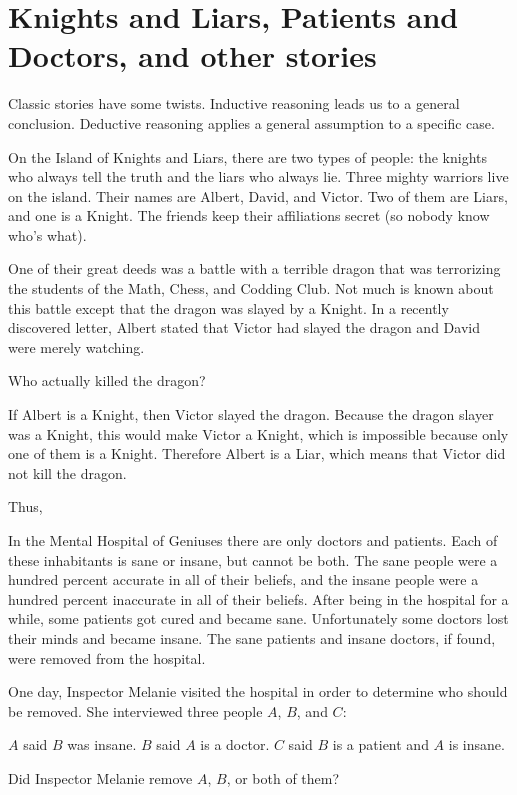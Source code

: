 \documentclass{article}
\begin{document}
\section*{Knights and Liars, Patients and Doctors, and other stories}

Classic stories have some twists. Inductive reasoning leads us to a general conclusion.
Deductive reasoning applies a general assumption to a specific case.

\begin{example*}
    \label{example:pi-2022-4-p9}
    On the Island of Knights and Liars, there are two types of people:
    the knights who always tell the truth and the liars who always lie.
    Three mighty warriors live on the island.
    Their names are Albert, David, and Victor.
    Two of them are Liars, and one is a Knight.
    The friends keep their affiliations secret (so nobody know who's what).

    One of their great deeds was a battle with a terrible dragon
    that was terrorizing the students of the Math, Chess, and Codding Club.
    Not much is known about this battle except that the dragon was slayed by a Knight.
    In a recently discovered letter, Albert stated that Victor had slayed the dragon
    and David were merely watching.

    Who actually killed the dragon?
\end{example*}

\begin{soln} 
    If Albert is a Knight, then Victor slayed the dragon.
    Because the dragon slayer was a Knight, this would make Victor a Knight,
    which is impossible because only one of them is a Knight.
    Therefore Albert is a Liar, which means that Victor did not kill the dragon.
    
    Thus, 
\end{soln}

\begin{example*}
    \label{example:pi-2022-4-p10}
    In the Mental Hospital of Geniuses there are only doctors and patients.
    Each of these inhabitants is sane or insane, but cannot be both.
    The sane people were a hundred percent accurate in all of their beliefs, 
    and the insane people were a hundred percent inaccurate in all of their beliefs.
    After being in the hospital for a while, some patients got cured and became sane.
    Unfortunately some doctors lost their minds and became insane.
    The sane patients and insane doctors, if found, were removed from the hospital.
    
    One day, Inspector Melanie visited the hospital in order to determine who should be removed.
    She interviewed three people $A$, $B$, and $C$:
    \begin{itemize}[topsep=0pt, partopsep=0pt, itemsep=0pt]
        \ii $A$ said $B$ was insane.
        \ii $B$ said $A$ is a doctor.
        \ii $C$ said $B$ is a patient and $A$ is insane.
    \end{itemize}

    Did Inspector Melanie remove $A$, $B$, or both of them?
\end{example*}
\end{document}

